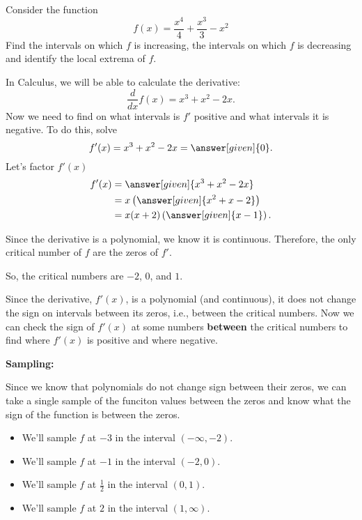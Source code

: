 \documentclass{ximera}
\begin{document}
\begin{example}


Consider the function 
\[
f(x) = \frac{x^4}{4}+\frac{x^3}{3}-x^2
\]
Find the intervals on which $f$ is increasing, the intervals on which $f$ is decreasing and
identify the local extrema of $f$.


\begin{explanation}
In Calculus, we will be able to calculate the derivative:
\[
\frac{d}{dx} f(x) = x^3+x^2-2x.
\]
Now we need to find on what intervals is $f'$ positive and what intervals it is
negative. To do this, solve 
\[
f'(x) = x^3+x^2-2x = \answer[given]{0}.
\]
Let's factor $f'(x)$
\begin{align*}
f'(x) &= \answer[given]{x^3+x^2-2x} \\
&=x\left(\answer[given]{x^2+x-2}\right)\\
&=x(x+2)\left(\answer[given]{x-1}\right).
\end{align*}


Since the derivative is a polynomial, we know it is continuous.  Therefore, the only critical number of $f$ are the zeros of $f'$.


So, the critical numbers are  $-2$, $0$, and $1$. 



Since the derivative, $f'(x)$, is a polynomial (and continuous), it does not change the sign on intervals between its zeros, i.e., between the critical numbers. Now we can check the sign of $f'(x)$ at some numbers \textbf{between} the critical numbers to find where $f'(x)$ is positive and where negative.




\textbf{Sampling: } 


Since we know that polynomials do not change sign between their zeros, we can take a single sample of the funciton values between the zeros and know what the sign of the function is between the zeros. \\



\begin{itemize}
\item We'll sample $f$ at $-3$ in the interval $(-\infty, -2)$. \\
\item We'll sample $f$ at $-1$ in the interval $(-2, 0)$. \\
\item We'll sample $f$ at $\frac{1}{2}$ in the interval $(0, 1)$. \\
\item We'll sample $f$ at $2$ in the interval $(1, \infty)$. \\
\end{itemize}




\end{explanation}
\end{example}
\end{document}
